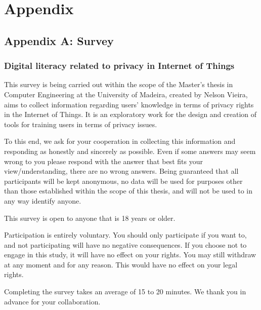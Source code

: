 %
%
\chapter*{Appendix}

\section*[Appendix A]{Appendix A: Survey}\label{appendix:survey}

\subsection*{Digital literacy related to privacy in Internet of Things}

This survey is being carried out within the scope of the Master's thesis in
Computer Engineering at the University of Madeira, created by Nelson Vieira,
aims to collect information regarding users' knowledge in terms of privacy rights
in the Internet of Things. It is an exploratory work for the design and creation
of tools for training users in terms of privacy issues.

To this end, we ask for your cooperation in collecting this information and
responding as honestly and sincerely as possible. Even if some answers may
seem wrong to you please respond with the answer that best fits your view/understanding,
there are no wrong answers. Being guaranteed that all participants will be kept
anonymous, no data will be used for purposes other than those established within
the scope of this thesis, and will not be used to in any way identify anyone.

This survey is open to anyone that is 18 years or older.

Participation is entirely voluntary. You should only participate if you want
to, and not participating will have no negative consequences. If you choose
not to engage in this study, it will have no effect on your rights. You may
still withdraw at any moment and for any reason. This would have no effect
on your legal rights.

Completing the  survey takes an average of 15 to 20 minutes. We thank you in
advance for your collaboration.

